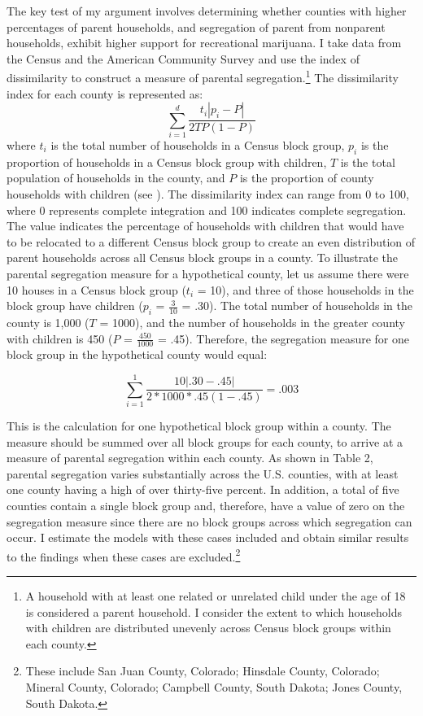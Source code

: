 The key test of my argument involves determining whether counties with higher percentages of parent households, and segregation of parent from nonparent households, exhibit higher support for recreational marijuana. I take data from the Census and the American Community Survey and use the index of dissimilarity to construct a measure of parental segregation.\footnote{A household with at least one related or unrelated child under the age of 18 is considered a parent household. I consider the extent to which households with children are distributed unevenly across Census block groups within each county.} The dissimilarity index for each county is represented as:
\begin{equation}
\sum_{i = 1}^{d} \frac{t_{i} \left| p_{i}-P \right|}{2TP (1-P)}
\end{equation}
where $t_{i}$ is the total number of households in a Census block group, $p_{i}$ is the proportion of households in a Census block group with children, $T$ is the total population of households in the county, and $P$ is the proportion of county households with children (see \citealt{massey_and_denton_1988}). The dissimilarity index can range from 0 to 100, where 0 represents complete integration and 100 indicates complete segregation. The value indicates the percentage of households with children that would have to be relocated to a different Census block group to create an even distribution of parent households across all Census block groups in a county. To illustrate the parental segregation measure for a hypothetical county, let us assume there were 10 houses in a Census block group ($t_{i}$ = 10), and three of those households in the block group have children ($p_{i}$  = $\frac{3}{10}$ = .30). The total number of households in the county is 1,000 ($T$ = 1000), and the number of households in the greater county with children is 450 ($P$ = $\frac{450}{1000}$ = .45). Therefore, the segregation measure for one block group in the hypothetical county would equal: 

\begin{equation}
\sum_{i = 1}^{1} \frac{10 \left| .30-.45 \right|}{2*1000*.45(1-.45)} = .003
\end{equation}

This is the calculation for one hypothetical block group within a county. The measure should be summed over all block groups for each county, to arrive at a measure of parental segregation within each county. 
As shown in Table 2, parental segregation varies substantially across the U.S. counties, with at least one county having a high of over thirty-five percent. In addition, a total of five counties contain a single block group and, therefore, have a value of zero on the segregation measure since there are no block groups across which segregation can occur. I estimate the models with these cases included and obtain similar results to the findings when these cases are excluded.\footnote{These include San Juan County, Colorado; Hinsdale County, Colorado; Mineral County, Colorado; Campbell County, South Dakota; Jones County, South Dakota.}

